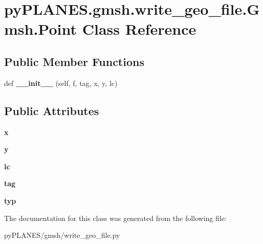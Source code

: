\hypertarget{classpy_p_l_a_n_e_s_1_1gmsh_1_1write__geo__file_1_1_gmsh_1_1_point}{}\section{py\+P\+L\+A\+N\+E\+S.\+gmsh.\+write\+\_\+geo\+\_\+file.\+Gmsh.\+Point Class Reference}
\label{classpy_p_l_a_n_e_s_1_1gmsh_1_1write__geo__file_1_1_gmsh_1_1_point}
\subsection*{Public Member Functions}
\begin{DoxyCompactItemize}
\item 
\mbox{\label{classpy_p_l_a_n_e_s_1_1gmsh_1_1write__geo__file_1_1_gmsh_1_1_point_ac22b99f32ff7ce6a004ce7852a69da1d}} 
def {\bfseries \+\_\+\+\_\+init\+\_\+\+\_\+} (self, f, tag, x, y, lc)
\end{DoxyCompactItemize}
\subsection*{Public Attributes}
\begin{DoxyCompactItemize}
\item 
\mbox{\label{classpy_p_l_a_n_e_s_1_1gmsh_1_1write__geo__file_1_1_gmsh_1_1_point_a863f8ad65f9d28fdbd72edfcaadb4b52}} 
{\bfseries x}
\item 
\mbox{\label{classpy_p_l_a_n_e_s_1_1gmsh_1_1write__geo__file_1_1_gmsh_1_1_point_a96956e2c0e3f88264312b6c2fffbc15a}} 
{\bfseries y}
\item 
\mbox{\label{classpy_p_l_a_n_e_s_1_1gmsh_1_1write__geo__file_1_1_gmsh_1_1_point_a4c09e0d85ac5ffd631bb1a80b83b011a}} 
{\bfseries lc}
\item 
\mbox{\label{classpy_p_l_a_n_e_s_1_1gmsh_1_1write__geo__file_1_1_gmsh_1_1_point_ae41f0755d91a10ab077fc7234a9477f8}} 
{\bfseries tag}
\item 
\mbox{\label{classpy_p_l_a_n_e_s_1_1gmsh_1_1write__geo__file_1_1_gmsh_1_1_point_ae54ce306525845b93a89dc1fa534e768}} 
{\bfseries typ}
\end{DoxyCompactItemize}


The documentation for this class was generated from the following file\+:\begin{DoxyCompactItemize}
\item 
py\+P\+L\+A\+N\+E\+S/gmsh/write\+\_\+geo\+\_\+file.\+py\end{DoxyCompactItemize}
